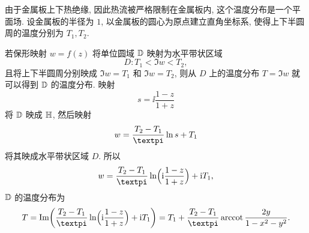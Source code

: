 \begin{solution}
  由于金属板上下热绝缘, 因此热流被严格限制在金属板内, 这个温度分布是一个平面场.
  设金属板的半径为 $1$, 以金属板的圆心为原点建立直角坐标系, 使得上下半圆周的温度分别为 $T_1,T_2$.

  若保形映射 $w=f(z)$ 将单位圆域 ${\mathbb{D}}$ 映射为水平带状区域 
  \[
    D:T_1<\Im w<T_2,
  \]
  且将上下半圆周分别映成 $\Im w=T_1$ 和 $\Im w=T_2$, 则从 $D$ 上的温度分布 $T=\Im w$ 就可以得到 ${\mathbb{D}}$ 的温度分布.
  映射
  \[
    s=\ii\dfrac{1-z}{1+z}
  \]
  将 ${\mathbb{D}}$ 映成 ${\mathbb{H}}$, 然后映射
  \[
    w=\dfrac{T_2-T_1}\cpi \ln s+T_1
  \]
  将其映成水平带状区域 $D$.
  所以
  \[
    w=\dfrac{T_2-T_1}\cpi \ln \Bigl(\ii\frac{1-z}{1+z}\Bigr)+\ii T_1,
  \]
  ${\mathbb{D}}$ 的温度分布为
  \[
    T=\Im\biggl(\dfrac{T_2-T_1}\cpi \ln \Bigl(\ii\frac{1-z}{1+z}\Bigr)+\ii T_1\biggr)
    =T_1+\frac{T_2-T_1}\cpi \arccot\frac{2y}{1-x^2-y^2}.
  \]
\end{solution}


\newpage
{}

